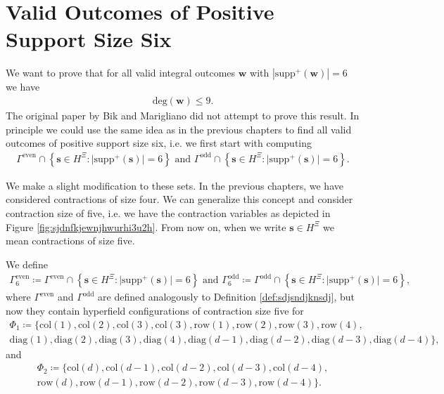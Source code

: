 \chapter{Valid Outcomes of Positive Support Size Six}

We want to prove that for all valid integral outcomes \( \mathbf w \) with \( |\mathrm{supp}^+(\mathbf w)| = 6 \) we have
\begin{align*}
    \mathrm{deg}(\mathbf w) \leq 9.
\end{align*}
The original paper by Bik and Marigliano \cite{bik2022classifying} did not attempt to prove this result. 
In principle we could use the same idea as in the previous chapters to find all valid outcomes of positive support size six, i.e. we first start with computing 
\begin{align*}
    \Gamma^{\mathrm{even}} \cap \left\{ \mathbf{s} \in H^{\Xi} : \lvert \mathrm{supp}^+(\mathbf{s}) \rvert = 6 \right\}
        \text{ and }
         \Gamma^{\mathrm{odd}} \cap \left\{ \mathbf{s} \in H^{\Xi} : \lvert \mathrm{supp}^+(\mathbf{s}) \rvert = 6 \right\}.
\end{align*}

We make a slight modification to these sets. In the previous chapters, we have considered contractions of size four. We can generalize this concept and consider contraction size of five, i.e. we have the contraction variables as depicted in Figure \ref{fig:sjdnfkjewnjhwurhi3u2h}. From now on, when we write \( \mathbf{s} \in H^{\Xi} \) we mean contractions of size five.

\begin{definition}
    We define 
    \begin{gather*}
        \Gamma^{\mathrm{even}}_6 \coloneqq \Gamma^{\mathrm{even}} \cap \left\{ \mathbf{s} \in H^{\Xi} : \lvert \mathrm{supp}^+(\mathbf{s}) \rvert = 6 \right\}
        \text{ and }
        \Gamma^{\mathrm{odd}}_6 \coloneqq \Gamma^{\mathrm{odd}} \cap \left\{ \mathbf{s} \in H^{\Xi} : \lvert \mathrm{supp}^+(\mathbf{s}) \rvert = 6 \right\},
    \end{gather*}
    where \( \Gamma^{\mathrm{even}}  \) and \(  \Gamma^{\mathrm{odd}} \) are defined analogously to Definition \ref{def:sdjsndjknsdj}, but now they contain hyperfield configurations of contraction size five for 
    \begin{gather*}
        \Phi_1 \coloneqq \{ 
            \mathrm{col}(1), \mathrm{col}(2), \mathrm{col}(3), \mathrm{col}(3), \mathrm{row}(1), \mathrm{row}(2), \mathrm{row}(3),  \mathrm{row}(4),\\
             \mathrm{diag}(1), \mathrm{diag}(2), \mathrm{diag}(3), \mathrm{diag}(4), \mathrm{diag}(d-1), \mathrm{diag}(d-2), \mathrm{diag}(d-3), \mathrm{diag}(d-4) 
         \},
    \end{gather*}
    and 
    \begin{gather*}
        \Phi_2 \coloneqq \{ 
            \mathrm{col}(d), \mathrm{col}(d-1), \mathrm{col}(d-2), \mathrm{col}(d-3), \mathrm{col}(d-4), \\
            \mathrm{row}(d), \mathrm{row}(d-1), \mathrm{row}(d-2), \mathrm{row}(d-3), \mathrm{row}(d-4) 
         \}.
    \end{gather*}
\end{definition}


